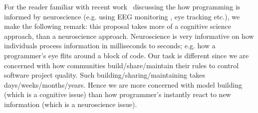  






















For the reader familiar with recent work~\cite{Siegmund17,DAngelo17,Fritz14} 
discussing the how programming is informed by neuroscience  
 (e.g. using EEG monitoring , eye tracking etc.), we make the following
remark: this proposal takes more of a cognitive science approach, than a neuroscience approach.
Neuroscience is very informative on how individuals process information in milliseconds
to seconds; e.g. how a  programmer's eye flits around a block of code. Our task is
different  since we are  concerned with how communities build/share/maintain their rules to control
software project quality. Such building/sharing/maintaining takes days/weeks/months/years.
Hence we are more concerned with model building (which is a cognitive issue) than how
programmer's instantly react to new information (which is a neuroscience issue).
 
